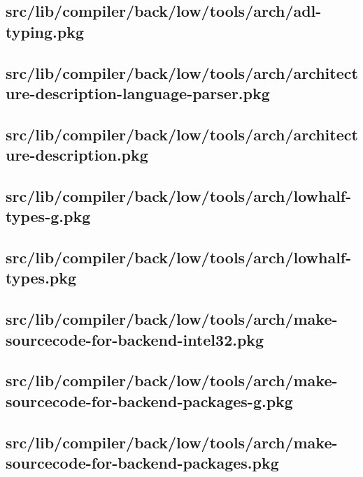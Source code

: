 \subsection{src/lib/compiler/back/low/tools/arch/adl-typing.pkg}


\subsection{src/lib/compiler/back/low/tools/arch/architecture-description-language-parser.pkg}


\subsection{src/lib/compiler/back/low/tools/arch/architecture-description.pkg}


\subsection{src/lib/compiler/back/low/tools/arch/lowhalf-types-g.pkg}


\subsection{src/lib/compiler/back/low/tools/arch/lowhalf-types.pkg}


\subsection{src/lib/compiler/back/low/tools/arch/make-sourcecode-for-backend-intel32.pkg}


\subsection{src/lib/compiler/back/low/tools/arch/make-sourcecode-for-backend-packages-g.pkg}


\subsection{src/lib/compiler/back/low/tools/arch/make-sourcecode-for-backend-packages.pkg}



